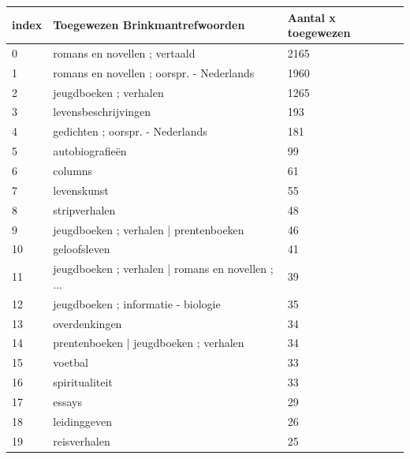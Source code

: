 \documentclass{article}
\begin{document}
\begin{tabular}{| l | l | l |}
\hline
\textbf{index} & \textbf{Toegewezen Brinkmantrefwoorden} & \textbf{Aantal x toegewezen} \\
\hline
0  &           romans en novellen ; vertaald                       &  2165  \\
1  &           romans en novellen ; oorspr. - Nederlands           &  1960  \\
2  &                              jeugdboeken ; verhalen           &  1265  \\
3  &                                levensbeschrijvingen           &  193   \\
4  &                    gedichten ; oorspr. - Nederlands           &  181   \\
5  &                                    autobiografieën            &  99    \\
6  &                                             columns           &  61    \\
7  &                                         levenskunst           &  55    \\
8  &                                       stripverhalen           &  48    \\
9  &              jeugdboeken ; verhalen | prentenboeken           &  46    \\ 
10 &                                       geloofsleven            &  41    \\
11 &  jeugdboeken ; verhalen | romans en novellen ; ...            &  39    \\
12 &                jeugdboeken ; informatie - biologie            &  35    \\
13 &                                      overdenkingen            &  34    \\
14 &             prentenboeken | jeugdboeken ; verhalen            &  34    \\
15 &                                            voetbal            &  33    \\
16 &                                     spiritualiteit            &  33    \\
17 &                                             essays            &  29    \\
18 &                                       leidinggeven            &  26    \\
19 &                                       reisverhalen            &  25    \\
\hline
\end{tabular}
\end{document}
